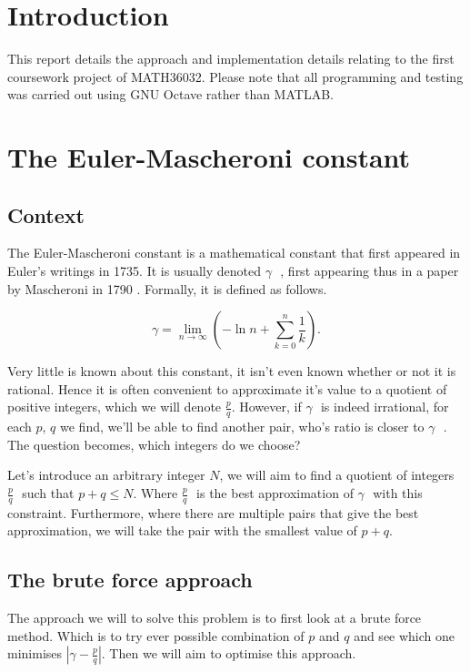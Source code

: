 \documentclass[10pt]{article}
\newcommand*{\gam}{$\gamma \text{ }$}
\newcommand*{\pdivq}{$\frac{p}{q} \text{ }$}
\begin{document}
\section{Introduction}

This report details the approach and implementation details relating to the first coursework project of MATH36032. Please note that all programming and testing was carried out using GNU Octave rather than MATLAB.
\section{The Euler-Mascheroni constant}

\subsection{Context}
The Euler-Mascheroni constant is a mathematical constant that first appeared in Euler's writings in 1735. It is usually denoted \gam, first appearing thus in a paper by Mascheroni in 1790 \cite{eulerconst}. Formally, it is defined as follows.

\begin{equation}
\gamma = \lim_{n \to \infty}  \left( -\ln{n} + \sum_{k=0}^{n} \frac{1}{k}  \right).
\end{equation}

Very little is known about this constant, it isn't even known whether or not it is rational. Hence it is often convenient to approximate it's value to a quotient of positive integers, which we will denote $ \frac{p}{q}$. However, if \gam is indeed irrational, for each $p$, $q$ we find, we'll be able to find another pair, who's ratio is closer to \gam. The question becomes, which integers do we choose?

Let's introduce an arbitrary integer $N$, we will aim to find a quotient of integers \pdivq such that $p + q \leq N$. Where \pdivq is the best approximation of \gam with this constraint. Furthermore, where there are multiple pairs that give the best approximation, we will take the pair with the smallest value of $p+q$.

\subsection{The brute force approach}

The approach we will to solve this problem is to first look at a brute force method. Which is to try ever possible combination of $p$ and $q$ and see which one minimises $ | \gamma - \frac{p}{q} |$. Then we will aim to optimise this approach.
\end{document}
